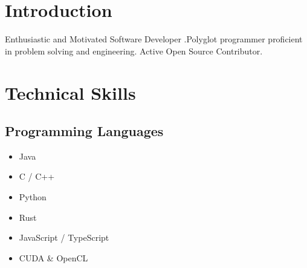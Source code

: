 \documentclass{article}
\date{}
\begin{document}
\title{\LARGE}
\author{\LARGE \textbf{Jagadeesh \textcolor{violet}{Kotra}} }
\maketitle

\section{Introduction}

Enthusiastic and Motivated Software Developer
.Polyglot programmer proficient in problem solving and engineering. Active Open Source Contributor.

\section{Technical Skills}
\subsection{Programming Languages}
\begin{multicols}{3}
    \begin{itemize}
    	\item Java
        \item C / C++
        \item Python
        \item Rust
        \item JavaScript / TypeScript
        \item CUDA \& OpenCL
    \end{itemize}
\end{multicols}
\end{document}
